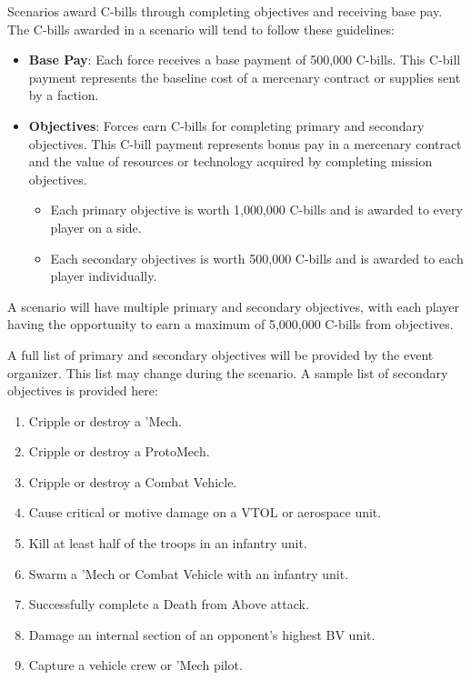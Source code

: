Scenarios award C-bills through completing objectives and receiving base pay.
The C-bills awarded in a scenario will tend to follow these guidelines:

\begin{itemize}

\item {\bfseries Base Pay}: Each force receives a base payment of 500,000 C-bills.
This C-bill payment represents the baseline cost of a mercenary contract or supplies sent by a faction.

\item {\bfseries Objectives}: Forces earn C-bills for completing primary and secondary objectives.
This C-bill payment represents bonus pay in a mercenary contract and the value of resources or technology acquired by completing mission objectives.

\begin{itemize}

\item Each primary objective is worth 1,000,000 C-bills and is awarded to every player on a side.

\item Each secondary objectives is worth 500,000 C-bills and is awarded to each player individually.

\end{itemize}

\end{itemize}

A scenario will have multiple primary and secondary objectives, with each player having the opportunity to earn a maximum of 5,000,000 C-bills from objectives.

A full list of primary and secondary objectives will be provided by the event organizer.
This list may change during the scenario.
A sample list of secondary objectives is provided here:

\begin{enumerate}

\item Cripple or destroy a 'Mech.

\item Cripple or destroy a ProtoMech.

\item Cripple or destroy a Combat Vehicle.

\item Cause critical or motive damage on a VTOL or aerospace unit.

\item Kill at least half of the troops in an infantry unit.

\item Swarm a 'Mech or Combat Vehicle with an infantry unit.

\item Successfully complete a Death from Above attack.

\item Damage an internal section of an opponent's highest BV unit.

\item Capture a vehicle crew or 'Mech pilot.

\end{enumerate}

